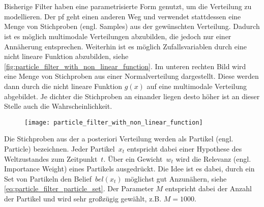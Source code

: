 %
%
\section{}
\label{sec:particle_filter}

Bisherige Filter haben eine parametrisierte Form genutzt, um die Verteilung zu modellieren. Der \Gls{pf} geht einen anderen Weg und verwendet stattdessen eine Menge von Stichproben (engl. Samples) aus der gewünschten Verteilung. Dadurch ist es möglich multimodale Verteilungen abzubilden, die jedoch nur einer Annäherung entsprechen. Weiterhin ist es möglich Zufallsvariablen durch eine nicht lineare Funktion abzubilden, siehe \autoref {fig:particle_filter_with_non_linear_function}. Im unteren rechten Bild wird eine Menge von Stichproben aus einer Normalverteilung dargestellt. Diese werden dann durch die nicht lineare Funktion $g(x)$ auf eine multimodale Verteilung abgebildet. Je dichter die Stichproben an einander liegen desto höher ist an dieser Stelle auch die Wahrscheinlichkeit.

\begin{figure}
	\centering
	\texttt{[image: particle\_filter\_with\_non\_linear\_function]}
	\label{fig:particle_filter_with_non_linear_function}
\end{figure}

Die Stichproben aus der a posteriori Verteilung werden als Partikel (engl. Particle) bezeichnen. Jeder Partikel~$x_t$ entspricht dabei einer Hypothese des Weltzustandes zum Zeitpunkt~$t$. Über ein Gewicht~$w_t$ wird die Relevanz (engl. Importance Weight) eines Partikels ausgedrückt. Die Idee ist es dabei, durch ein Set von Partikeln den Belief~$bel(x_t)$ möglichst gut Anzunähern, siehe \autoref{eq:particle_filter_particle_set}. Der Parameter $M$ entspricht dabei der Anzahl der Partikel und wird sehr großzügig gewählt, z.B. $M=1000$.

